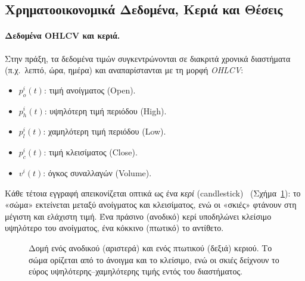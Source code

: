 \subsection{Χρηματοοικονομικά Δεδομένα, Κεριά και Θέσεις}
\label{subsec:data-candles}

\paragraph{Δεδομένα OHLCV και κεριά.}
Στην πράξη, τα δεδομένα τιμών συγκεντρώνονται σε διακριτά χρονικά διαστήματα
(π.χ.\ λεπτό, ώρα, ημέρα) και αναπαρίστανται με τη μορφή \emph{OHLCV}:
\begin{itemize}
    \item $p^i_o(t)$: τιμή ανοίγματος (Open).
    \item $p^i_h(t)$: υψηλότερη τιμή περιόδου (High).
    \item $p^i_l(t)$: χαμηλότερη τιμή περιόδου (Low).
    \item $p^i_c(t)$: τιμή κλεισίματος (Close).
    \item $v^i(t)$: όγκος συναλλαγών (Volume).
\end{itemize}
Κάθε τέτοια εγγραφή απεικονίζεται οπτικά
ως ένα \emph{κερί} (candlestick)~\cite{teall2022financial}
(Σχήμα~\ref{fig:candlestick}): το «σώμα» εκτείνεται μεταξύ ανοίγματος και
κλεισίματος, ενώ οι «σκιές» φτάνουν στη μέγιστη και ελάχιστη τιμή. Ένα πράσινο
(ανοδικό) κερί υποδηλώνει κλείσιμο υψηλότερο του ανοίγματος, ένα κόκκινο
(πτωτικό) το αντίθετο.

\begin{figure}[ht]
    \centering
    \caption{Δομή ενός ανοδικού (αριστερά) και ενός πτωτικού (δεξιά) κεριού.
    Το σώμα ορίζεται από το άνοιγμα και το κλείσιμο, ενώ οι σκιές δείχνουν το
    εύρος υψηλότερης--χαμηλότερης τιμής εντός του διαστήματος.}
    \label{fig:candlestick}
\end{figure}

